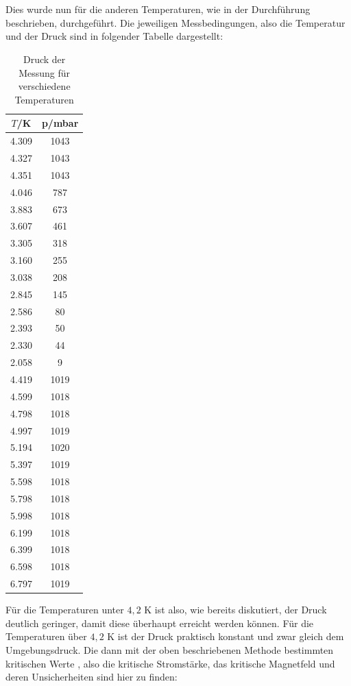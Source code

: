 \documentclass[german,  %
parskip=full,  %
]{scrartcl}
\begin{document}
\\\\
Dies wurde nun für die anderen Temperaturen, wie in der Durchführung beschrieben, durchgeführt.
Die jeweiligen Messbedingungen, also die Temperatur und der Druck sind in folgender Tabelle dargestellt:
\newpage
\begin{table} \centering
\begin{tabular}{|c|c|}
\hline
\(T\)/K & p/mbar \\\hline
4.309 & 1043\\\hline
4.327 & 1043\\\hline
4.351 & 1043\\\hline
4.046 & 787\\\hline
3.883 & 673\\\hline
3.607 & 461\\\hline
3.305 & 318\\\hline
3.160 & 255\\\hline
3.038 & 208\\\hline
2.845 & 145\\\hline
2.586 & 80\\\hline
2.393 & 50\\\hline
2.330 & 44\\\hline
2.058 & 9\\\hline
4.419 & 1019\\\hline
4.599 & 1018\\\hline
4.798 & 1018\\\hline
4.997 & 1019\\\hline
5.194 & 1020\\\hline
5.397 & 1019\\\hline
5.598 & 1018\\\hline
5.798 & 1018\\\hline
5.998 & 1018\\\hline
6.199 & 1018\\\hline
6.399 & 1018\\\hline
6.598 & 1018\\\hline
6.797 & 1019\\\hline
\end{tabular}
\caption{Druck der Messung für verschiedene Temperaturen}
\label{tab1}
\end{table}
Für die Temperaturen unter $4,2$ K ist also, wie bereits diskutiert, der Druck deutlich geringer, damit diese überhaupt erreicht werden können. Für die Temperaturen über $4,2$ K ist der Druck praktisch konstant und zwar gleich dem Umgebungsdruck.
\newpage
Die dann mit der oben beschriebenen Methode bestimmten kritischen Werte , also die kritische Stromstärke, das kritische Magnetfeld und deren Unsicherheiten sind hier zu finden:
\end{document}
